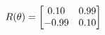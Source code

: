 \documentclass[preview]{standalone}
\begin{document}
\begin{align*}
\special{dvisvgm:raw <g id='unique000'>}R(\theta) = \begin{bmatrix}0.10 & 0.99\\-0.99 & 0.10\end{bmatrix}\special{dvisvgm:raw </g>}
\end{align*}
\end{document}
